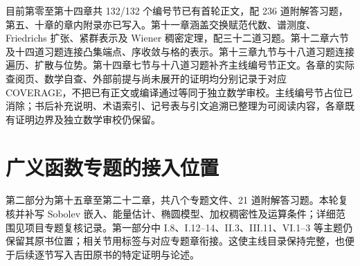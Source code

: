 目前第零至第十四章共 132/132 个编号节已有首轮正文，配 236 道附解答习题，第五、十章的章内附录亦已写入。第十一章涵盖交换赋范代数、谱测度、Friedrichs 扩张、紧群表示及 Wiener 稠密定理，配三十二道习题。第十二章六节及十四道习题连接凸集端点、序收敛与格的表示。第十三章九节与十八道习题连接遍历、扩散与位势。第十四章七节与十八道习题补齐主线编号节正文。各章的实际查阅页、数学自查、外部前提与尚未展开的证明均分别记录于对应 COVERAGE，不把已有正文或编译通过等同于独立数学审校。主线编号节占位已消除；书后补充说明、术语索引、记号表与引文追溯已整理为可阅读内容，各章既有证明边界及独立数学审校仍保留。

\section{广义函数专题的接入位置}
第二部分为第十五章至第二十二章，共八个专题文件、21 道附解答习题。本轮复核并补写 Sobolev 嵌入、能量估计、椭圆模型、加权稠密性及运算条件；详细范围见项目专题复核记录。第一部分中 I.8、I.12--14、II.3、III.11、VI.1--3 等主题仍保留其原书位置；相关节用标签与对应专题章衔接。这使主线目录保持完整，也便于后续逐节写入吉田原书的特定证明与论述。
